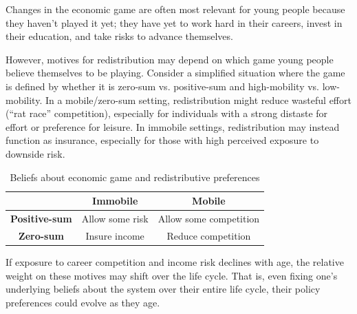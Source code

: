 \documentclass{article}
\begin{document}
Changes in the economic game are often most relevant for young people because they haven't played it yet; they have yet to work hard in their careers, invest in their education, and take risks to advance themselves. 

However, motives for redistribution may depend on which game young people believe themselves to be playing. Consider a simplified situation where the game is defined by whether it is zero-sum vs. positive-sum and high-mobility vs. low-mobility. In a mobile/zero-sum setting,
redistribution might reduce wasteful effort (“rat race” competition), especially for individuals with a strong distaste for effort
or preference for leisure. In immobile settings, redistribution may instead function as insurance, especially for those with high perceived exposure to downside risk.

\begin{table}[H]
    \centering
    \begin{tabular}{c|cc}
        & \textbf{Immobile} & \textbf{Mobile} \\
        \hline
        \textbf{Positive-sum} & Allow some risk & Allow some competition \\
        \textbf{Zero-sum} & Insure income & Reduce competition
    \end{tabular}
    \caption{Beliefs about economic game and redistributive preferences}
\end{table}

If exposure to career competition and income risk declines with age, the relative weight on these motives may shift over the
life cycle. That is, even fixing one's underlying beliefs about the system over their entire life cycle, their policy preferences could evolve as they age.
\end{document}
